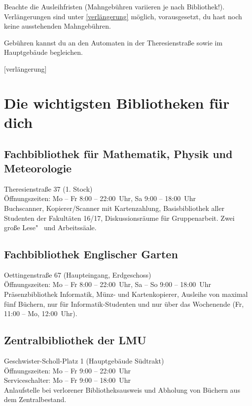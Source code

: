 Beachte die Ausleihfristen (Mahngebühren variieren je nach Bibliothek!). 
Verlängerungen sind unter \ref{verlängerung}
möglich, vorausgesetzt, du hast noch keine ausstehenden Mahngebühren.

Gebühren kannst du an den Automaten in der Theresienstraße sowie
im Hauptgebäude begleichen.

\begin{urlList}
	[verlängerung]
\end{urlList}

\section{Die wichtigsten Bibliotheken für dich}

\subsection*{Fachbibliothek für Mathematik, Physik und Meteorologie\subjectList{\subjectM\subjectW\subjectP}}
Theresienstraße 37 (1. Stock)\\
Öffnungszeiten: Mo -- Fr 8:00 -- 22:00~Uhr, Sa 9:00 -- 18:00~Uhr\\
Buchscanner, Kopierer/Scanner mit Kartenzahlung, Basisbibliothek aller
Studenten der Fakultäten 16/17, Diskussionsräume für Gruppenarbeit.
Zwei große Lese"~ und Arbeitssäale.

\subsection*{Fachbibliothek Englischer Garten\subjectList{\subjectI\subjectMI}}
Oettingenstraße 67 (Haupteingang, Erdgeschoss)\\
Öffnungszeiten: Mo -- Fr 8:00 -- 22:00~Uhr, Sa -- So 9:00 -- 18:00~Uhr\\
Präsenzbibliothek Informatik, Münz- und Kartenkopierer, Ausleihe von maximal fünf Büchern, nur für Informatik-Studenten und nur über das Wochenende (Fr, 11:00 -- Mo, 12:00~Uhr).

\subsection*{Zentralbibliothek der LMU}
Geschwister-Scholl-Platz 1 (Hauptgebäude Südtrakt)\\
Öffnungszeiten: Mo -- Fr 9:00 -- 22:00~Uhr\\
Serviceschalter: Mo -- Fr 9:00 -- 18:00~Uhr\\
Anlaufstelle bei verlorener Bibliotheksausweis und Abholung von Büchern aus dem Zentralbestand.

